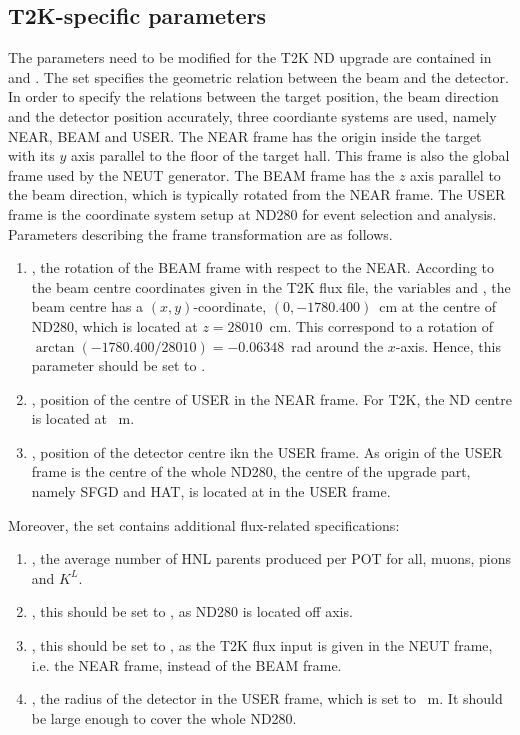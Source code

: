     \subsection{T2K-specific parameters}
    The parameters need to be modified for the T2K ND upgrade are contained in  and .
    The  set specifies the geometric relation between the beam and the detector. 
    In order to specify the relations between the target position, the beam direction and the detector position accurately, three coordiante systems are used, namely NEAR, BEAM and USER.
    The NEAR frame has the origin inside the target with its $y$ axis parallel to the floor of the target hall.
    This frame is also the global frame used by the NEUT generator.
    The BEAM frame has the $z$ axis parallel to the beam direction, which is typically rotated from the NEAR frame.
    The USER frame is the coordinate system setup at ND280 for event selection and analysis.
    Parameters describing the frame transformation are as follows.
    \begin{enumerate}
        \item {}, the rotation of the BEAM frame with respect to the NEAR. 
        According to the beam centre coordinates given in the T2K flux file, the variables  and , the beam centre has a $(x,y)$-coordinate, $(0,-1780.400)$~cm at the centre of ND280, which is located at $z=28010$~cm. 
        This correspond to a rotation of $\arctan(-1780.400/28010)=-0.06348$~rad around the $x$-axis.
        Hence, this parameter should be set to . 
        \item {}, position of the centre of USER in the NEAR frame.
        For T2K, the ND centre is located at ~m.
        \item {}, position of the detector centre ikn the USER frame. 
        As origin of the USER frame is the centre of the whole ND280, the centre of the upgrade part, namely SFGD and HAT, is located at  in the USER frame.
    \end{enumerate}   

    Moreover, the  set contains additional flux-related specifications:
    \begin{enumerate}
        \item {}, the average number of HNL parents produced per POT for all, muons, pions and $K^{L}$.
        \item {}, this should be set to , as ND280 is located off axis.
        \item {}, this should be set to , as the T2K flux input is given in the NEUT frame, i.e. the NEAR frame, instead of the BEAM frame.
        \item {}, the radius of the detector in the USER frame, which is set to ~m. 
        It should be large enough to cover the whole ND280.
    \end{enumerate}



